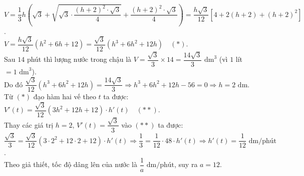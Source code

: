 \begin{ex}
{	$V = \dfrac{1}{3}h \left( \sqrt{3} + \sqrt{\sqrt{3} \cdot \dfrac{(h+2)^2 \cdot \sqrt{3}}{4}} + \dfrac{(h+2)^2 \cdot \sqrt{3}}{4} \right) = \dfrac{h\sqrt{3}}{12} \left[ 4 + 2(h+2) + (h+2)^2 \right]$. \\
	$V = \dfrac{h\sqrt{3}}{12} \left(h^2 + 6h + 12\right) = \dfrac{\sqrt{3}}{12} \left(h^3 + 6h^2 + 12h\right) \quad (*)$. \\
	Sau $14$ phút thì lượng nước trong chậu là $V = \dfrac{\sqrt{3}}{3} \times 14 = \dfrac{14\sqrt{3}}{3} \text{ dm}^3$ (vì $1$ lít $= 1 \text{ dm}^3$). \\
	Do đó $\dfrac{\sqrt{3}}{12} \left(h^3 + 6h^2 + 12h\right) = \dfrac{14\sqrt{3}}{3} \Rightarrow h^3 + 6h^2 + 12h - 56 = 0 \Rightarrow h = 2 \text{ dm}$. \\
	Từ $(*)$ đạo hàm hai vế theo $t$ ta được: $V'(t) = \dfrac{\sqrt{3}}{12} \left(3h^2 + 12h + 12\right) \cdot h'(t) \quad (**)$. \\
	Thay các giá trị $h = 2$, $V'(t) = \dfrac{\sqrt{3}}{3}$ vào $(**)$ ta được: \\
	$\dfrac{\sqrt{3}}{3} = \dfrac{\sqrt{3}}{12} \left(3 \cdot 2^2 + 12 \cdot 2 + 12\right) \cdot h'(t) \Rightarrow \dfrac{1}{3} = \dfrac{1}{12} \cdot 48 \cdot h'(t) \Rightarrow h'(t) = \dfrac{1}{12} \text{ dm/phút}$. \\
	Theo giả thiết, tốc độ dâng lên của nước là $\dfrac{1}{a} \text{ dm/phút}$, suy ra $a = 12$.
	}
\end{ex}



